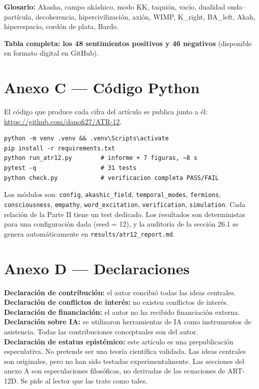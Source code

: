 \textbf{Glosario:} Akasha, campo akáshico, modo KK, taquión, vacío, dualidad onda--partícula, decoherencia, hipercivilización, axión, WIMP, K\_right, BA\_left, Akah, hiperespacio, cordón de plata, Bardo.

\textbf{Tabla completa: los 48 sentimientos positivos y 46 negativos} (disponible en formato digital en GitHub).

\section{Anexo C --- Código Python}
El código que produce cada cifra del artículo se publica junto a él: \url{https://github.com/danofi27/ATR-12}.

\begin{verbatim}
python -m venv .venv && .venv\Scripts\activate
pip install -r requirements.txt
python run_atr12.py        # informe + 7 figuras, ~8 s
pytest -q                  # 31 tests
python check.py            # verificacion completa PASS/FAIL
\end{verbatim}

Los módulos son: \texttt{config}, \texttt{akashic\_field}, \texttt{temporal\_modes}, \texttt{fermions}, \texttt{consciousness}, \texttt{empathy}, \texttt{word\_excitation}, \texttt{verification}, \texttt{simulation}. Cada relación de la Parte II tiene un test dedicado. Los resultados son deterministas para una configuración dada (seed = 12), y la auditoría de la sección 26.1 se genera automáticamente en \texttt{results/atr12\_report.md}.

\section{Anexo D --- Declaraciones}
\textbf{Declaración de contribución:} el autor concibió todas las ideas centrales. \\
\textbf{Declaración de conflictos de interés:} no existen conflictos de interés. \\
\textbf{Declaración de financiación:} el autor no ha recibido financiación externa. \\
\textbf{Declaración sobre IA:} se utilizaron herramientas de IA como instrumentos de asistencia. Todas las contribuciones conceptuales son del autor. \\
\textbf{Declaración de estatus epistémico:} este artículo es una prepublicación especulativa. No pretende ser una teoría científica validada. Las ideas centrales son originales, pero no han sido testadas experimentalmente. Las secciones del anexo A son especulaciones filosóficas, no derivadas de las ecuaciones de ART-12D. Se pide al lector que las trate como tales.

